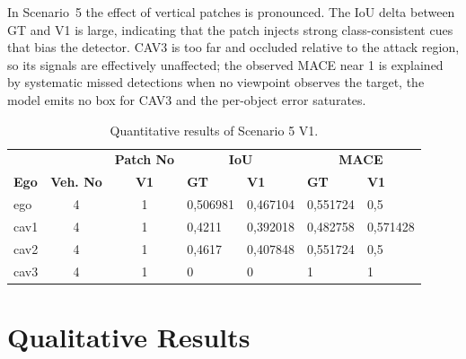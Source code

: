 In Scenario~5 the effect of vertical patches is pronounced. The IoU delta between GT and V1 is large, indicating that the patch injects strong class-consistent cues that bias the detector. 
CAV3 is too far and occluded relative to the attack region, so its signals are effectively unaffected; the observed MACE near 1 is explained by systematic missed detections when no viewpoint observes the target, the model emits no box for CAV3 and the per-object error saturates.

\begin{table}[H]
    \centering
    \caption{Quantitative results of Scenario 5 V1.}
    \label{tab:scenario5v1_results}
    \begin{tabularx}{\textwidth}{l c c *{4}{X}}
        \toprule
            &             &   \multicolumn{1}{c}{\textbf{Patch No}}  & \multicolumn{2}{c}{\textbf{IoU}} & \multicolumn{2}{c}{\textbf{MACE}}                            \\
        \cmidrule(lr){4-5}\cmidrule(lr){6-7}
        \textbf{Ego}           &
        \textbf{Veh. No}       &
        \textbf{V1}      &
        \textbf{GT}            & \textbf{V1}  &
        \textbf{GT}            & \textbf{V1}  \\
        \midrule
        ego         & 4  & 1 & 0,506981 & 0,467104 & 0,551724 & 0,5 \\
        cav1        & 4  & 1 & 0,4211 & 0,392018 & 0,482758 & 0,571428 \\
        cav2        & 4  & 1 & 0,4617 & 0,407848 & 0,551724 & 0,5 \\
        cav3        & 4  & 1 & 0 & 0 & 1 & 1 \\
        \bottomrule
    \end{tabularx}
\end{table}

\section{Qualitative Results}
\label{sec:qualitative_results}

